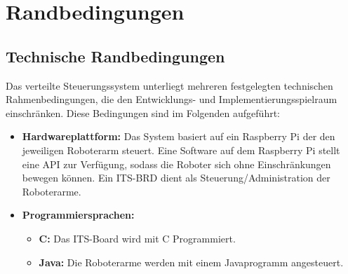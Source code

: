 

\chapter{Randbedingungen}

\section{Technische Randbedingungen}

Das verteilte Steuerungssystem unterliegt mehreren festgelegten technischen Rahmenbedingungen, die den Entwicklungs- und Implementierungsspielraum einschränken. Diese Bedingungen sind im Folgenden aufgeführt:

\begin{itemize}
    \item \textbf{Hardwareplattform:}  Das System basiert auf ein Raspberry Pi der den jeweiligen Roboterarm steuert. Eine Software auf dem Raspberry Pi stellt eine API zur Verfügung, sodass die Roboter sich ohne Einschränkungen bewegen können. %
     Ein ITS-BRD dient als Steuerung/Administration der Roboterarme.
    
    \item \textbf{Programmiersprachen:}  
    \begin{itemize}
        \item \textbf{C:} Das ITS-Board wird mit C Programmiert. 
        \item \textbf{Java:} Die Roboterarme werden mit einem Javaprogramm angesteuert.
    \end{itemize}
    \end{itemize}

